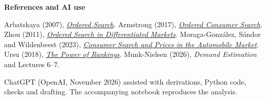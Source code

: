 \documentclass[a4paper,12pt]{article}
\newcommand{\subhead}[1]{\par\smallskip\noindent\textbf{#1}\par\nobreak\smallskip}
\begin{document}
\subhead{References and AI use}
Arbatskaya (2007), \href{https://doi.org/10.1111/j.1756-2171.2007.tb00047.x}{\emph{Ordered Search}}. Armstrong (2017), \href{https://doi.org/10.1093/jeea/jvx017}{\emph{Ordered Consumer Search}}. Zhou (2011), \href{https://doi.org/10.1016/j.ijindorg.2010.07.001}{\emph{Ordered Search in Differentiated Markets}}. Moraga-González, Sándor and Wildenbeest (2023), \href{https://doi.org/10.1093/restud/rdac047}{\emph{Consumer Search and Prices in the Automobile Market}}. Ursu (2018), \href{https://doi.org/10.1287/mksc.2017.1072}{\emph{The Power of Rankings}}. Munk-Nielsen (2026), \emph{Demand Estimation} and Lectures 6--7.

ChatGPT (OpenAI, November 2026) assisted with derivations, Python code, checks and drafting. The accompanying notebook reproduces the analysis.
\end{document}
